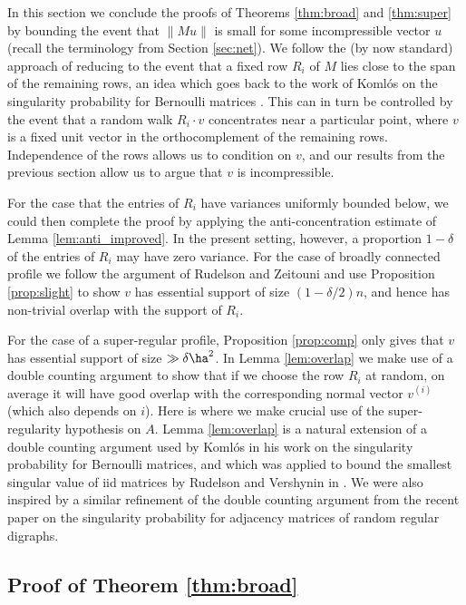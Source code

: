 \documentclass[aop,preprint]{imsart}
\theoremstyle{plain}
\theoremstyle{definition}
\theoremstyle{remark}
\numberwithin{equation}{section}
\numberwithin{theorem}{section}
\begin{document}
In this section we conclude the proofs of Theorems \ref{thm:broad} and \ref{thm:super} by bounding the event that $\|Mu\|$ is small for some incompressible vector $u$ (recall the terminology from Section \ref{sec:net}).
We follow the (by now standard) approach of reducing to the event that a fixed row $R_i$ of $M$ lies close to the span of the remaining rows, an idea which goes back to the work of Koml\'os on the singularity probability for Bernoulli matrices \citep{Komlos67,Komlos68,Komlos77}. 
This can in turn be controlled by the event that a random walk $R_i\cdot v$ concentrates near a particular point, where $v$ is a fixed unit vector in the orthocomplement of the remaining rows. 
Independence of the rows allows us to condition on $v$, and our results from the previous section allow us to argue that $v$ is incompressible. 

For the case that the entries of $R_i$ have variances uniformly bounded below, we could then complete the proof by applying the anti-concentration estimate of Lemma \ref{lem:anti_improved}.
In the present setting, however, a proportion $1-\delta$ of the entries of $R_i$ may have zero variance. 
For the case of broadly connected profile we follow the argument of Rudelson and Zeitouni \citep{RuZe} and use Proposition \ref{prop:slight} to show $v$ has essential support of size $(1-\delta/2)n$, and hence has non-trivial overlap with the support of $R_i$.

For the case of a super-regular profile, Proposition \ref{prop:comp} only gives that $v$ has essential support of size $\gg \delta \ha^2$. 
In Lemma \ref{lem:overlap} we make use of a double counting argument to show that if we choose the row $R_i$ at random, on average it will have good overlap with the corresponding normal vector $v^{(i)}$ (which also depends on $i$). 
Here is where we make crucial use of the super-regularity hypothesis on $A$.
Lemma \ref{lem:overlap} is a natural extension of a double counting argument used by Koml\'os in his work on the singularity probability for Bernoulli matrices, and which was applied to bound the smallest singular value of iid matrices by Rudelson and Vershynin in \citep{RuVe:ilo}.
We were also inspired by
a similar refinement of the double counting argument from the recent paper \citep{LLTTY} on the singularity probability for adjacency matrices of random regular digraphs.


\subsection{Proof of Theorem \ref{thm:broad}}	\label{sec:broad}
\end{document}
